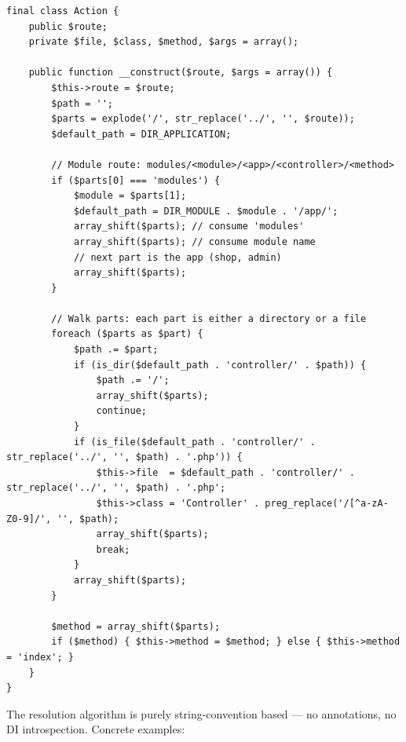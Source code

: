 \documentclass[11pt,a4paper]{article}
\begin{document}
\begin{lstlisting}[caption={\texttt{system/engine/action.php} --- route resolution algorithm (abridged).},label={lst:action}]
final class Action {
    public $route;
    private $file, $class, $method, $args = array();

    public function __construct($route, $args = array()) {
        $this->route = $route;
        $path = '';
        $parts = explode('/', str_replace('../', '', $route));
        $default_path = DIR_APPLICATION;

        // Module route: modules/<module>/<app>/<controller>/<method>
        if ($parts[0] === 'modules') {
            $module = $parts[1];
            $default_path = DIR_MODULE . $module . '/app/';
            array_shift($parts); // consume 'modules'
            array_shift($parts); // consume module name
            // next part is the app (shop, admin)
            array_shift($parts);
        }

        // Walk parts: each part is either a directory or a file
        foreach ($parts as $part) {
            $path .= $part;
            if (is_dir($default_path . 'controller/' . $path)) {
                $path .= '/';
                array_shift($parts);
                continue;
            }
            if (is_file($default_path . 'controller/' . str_replace('../', '', $path) . '.php')) {
                $this->file  = $default_path . 'controller/' . str_replace('../', '', $path) . '.php';
                $this->class = 'Controller' . preg_replace('/[^a-zA-Z0-9]/', '', $path);
                array_shift($parts);
                break;
            }
            array_shift($parts);
        }

        $method = array_shift($parts);
        if ($method) { $this->method = $method; } else { $this->method = 'index'; }
    }
}
\end{lstlisting}

The resolution algorithm is purely string-convention based --- no
annotations, no DI introspection. Concrete examples:
\end{document}
